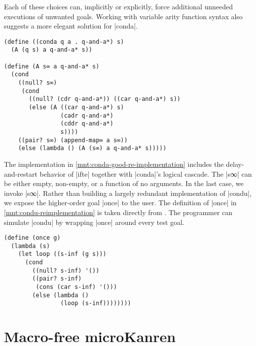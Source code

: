 \documentclass[sigplan,draft,natbib=false]{acmart}
\begin{document}
Each of these choices can, implicitly or explicitly, force additional
unneeded executions of unwanted goals. Working with variable arity
function syntax also suggests a more elegant solution for
\rackinline|conda|.

\begin{listing}
  \begin{verbatim}
(define ((conda q a . q-and-a*) s)
  (A (q s) a q-and-a* s))

(define (A s∞ a q-and-a* s)
  (cond
    ((null? s∞)
     (cond
       ((null? (cdr q-and-a*)) ((car q-and-a*) s))
       (else (A ((car q-and-a*) s)
                (cadr q-and-a*)
                (cddr q-and-a*)
                s))))
    ((pair? s∞) (append-map∞ a s∞))
    (else (lambda () (A (s∞) a q-and-a* s)))))
  \end{verbatim}
  \caption{A functional \rackinline|conda| implementation}
  \label{mnt:conda-good-re-implementation}
\end{listing}

The implementation in \cref{mnt:conda-good-re-implementation} includes
the delay-and-restart behavior of \rackinline|ifte| together with
\rackinline|conda|'s logical cascade. The \rackinline|s∞| can be
either empty, non-empty, or a function of no arguments. In the last
case, we invoke \rackinline|s∞|. Rather than building a largely
redundant implementation of \rackinline|condu|, we expose the
higher-order goal \rackinline|once| to the user. The definition of
\rackinline|once| in \cref{mnt:condu-reimplementation} is taken
directly from \cite{friedman2018reasoned}. The programmer can simulate
\rackinline|condu| by wrapping \rackinline|once| around every test
goal.


\begin{listing}
  \begin{verbatim}
(define (once g)
  (lambda (s)
    (let loop ((s-inf (g s)))
      (cond
        ((null? s-inf) '())
        ((pair? s-inf)
         (cons (car s-inf) '()))
        (else (lambda ()
                (loop (s-inf))))))))
  \end{verbatim}
  \caption{The \rackinline|once| function}
  \label{mnt:condu-reimplementation}
\end{listing}


\section{Macro-free microKanren}\label{sec:functional}
\end{document}

